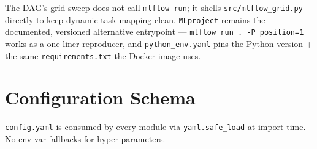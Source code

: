 \documentclass[11pt,a4paper]{article}
\begin{document}
The DAG's grid sweep does not call \texttt{mlflow run}; it shells \texttt{src/mlflow\_grid.py} directly to keep dynamic task mapping clean. \texttt{MLproject} remains the documented, versioned alternative entrypoint --- \texttt{mlflow run . -P position=1} works as a one-liner reproducer, and \texttt{python\_env.yaml} pins the Python version + the same \texttt{requirements.txt} the Docker image uses.

\newpage
\section{Configuration Schema}

\texttt{config.yaml} is consumed by every module via \texttt{yaml.safe\_load} at import time. No env-var fallbacks for hyper-parameters.
\end{document}
